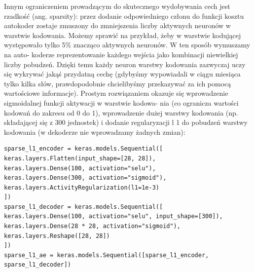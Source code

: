 \documentclass[12pt]{mwbk}
\theoremstyle{plain}
\theoremstyle{definition}
\theoremstyle{remark}
\begin{document}
\cite{geron}

Innym ograniczeniem prowadzącym do skutecznego wydobywania cech jest rzadkość (ang. sparsity):
przez dodanie odpowiedniego członu do funkcji kosztu autokoder zostaje zmuszony do zmniejszenia
liczby aktywnych neuronów w warstwie kodowania. Możemy sprawić na przykład, żeby w warstwie
kodującej występowało tylko 5\% znacząco aktywnych neuronów. W ten sposób wymuszamy na auto-
koderze reprezentowanie każdego wejścia jako kombinacji niewielkiej liczby pobudzeń. Dzięki temu
każdy neuron warstwy kodowania zazwyczaj uczy się wykrywać jakąś przydatną cechę (gdybyśmy
wypowiadali w ciągu miesiąca tylko kilka słów, prawdopodobnie chcielibyśmy przekazywać za ich
pomocą wartościowe informacje).
Prostym rozwiązaniem okazuje się wprowadzenie sigmoidalnej funkcji aktywacji w warstwie kodowa-
nia (co ogranicza wartości kodowań do zakresu od 0 do 1), wprowadzenie dużej warstwy kodowania
(np. składającej się z 300 jednostek) i dodanie regularyzacji l 1 do pobudzeń warstwy kodowania
(w dekoderze nie wprowadzamy żadnych zmian):
\begin{verbatim}
sparse_l1_encoder = keras.models.Sequential([
keras.layers.Flatten(input_shape=[28, 28]),
keras.layers.Dense(100, activation="selu"),
keras.layers.Dense(300, activation="sigmoid"),
keras.layers.ActivityRegularization(l1=1e-3)
])
sparse_l1_decoder = keras.models.Sequential([
keras.layers.Dense(100, activation="selu", input_shape=[300]),
keras.layers.Dense(28 * 28, activation="sigmoid"),
keras.layers.Reshape([28, 28])
])
sparse_l1_ae = keras.models.Sequential([sparse_l1_encoder,
sparse_l1_decoder])
\end{verbatim}
\end{document}
